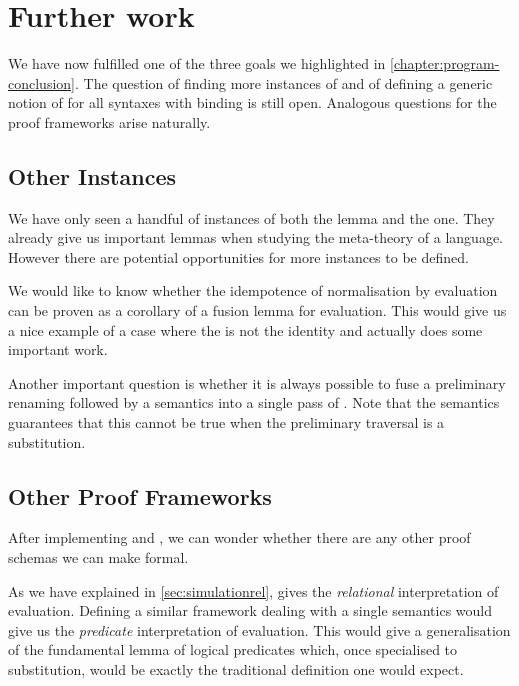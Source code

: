 \section{Further work}

We have now fulfilled one of the three goals we highlighted in
\cref{chapter:program-conclusion}. The question of finding more instances of
 and of defining a generic notion of  for all
syntaxes with binding is still open. Analogous questions for the proof
frameworks arise naturally.


\subsection{Other Instances}

We have only seen a handful of instances of both the  lemma and
the  one. They already give us important lemmas when studying the
meta-theory of a language. However there are potential opportunities for more
instances to be defined.

We would like to know whether the idempotence of normalisation by evaluation
can be proven as a corollary of a fusion lemma for evaluation. This would give
us a nice example of a case where the  is not the identity and
actually does some important work.

Another important question is whether it is always possible to fuse a preliminary
renaming followed by a semantics  into a single pass of . Note that
the  semantics guarantees that this cannot be true when the preliminary
traversal is a substitution.

\subsection{Other Proof Frameworks}

After implementing  and , we can wonder whether there
are any other proof schemas we can make formal.

As we have explained in \cref{sec:simulationrel},  gives the
\emph{relational} interpretation of evaluation. Defining a similar framework
dealing with a single semantics would give us the \emph{predicate} interpretation
of evaluation. This would give a generalisation of the fundamental lemma of logical
predicates which, once specialised to substitution, would be exactly the traditional
definition one would expect.

